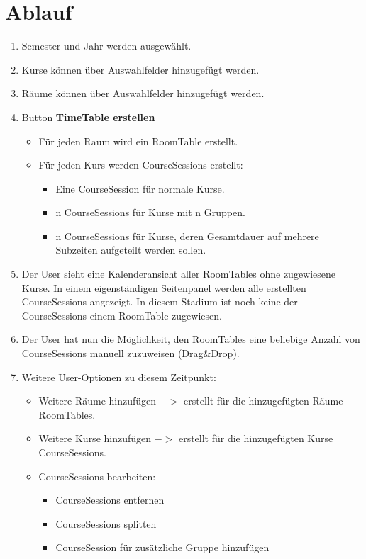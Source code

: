 \documentclass{article}
\begin{document}
	\section{Ablauf}
	\begin{enumerate}
		\item Semester und Jahr werden ausgewählt.
		\item Kurse können über Auswahlfelder hinzugefügt werden.
		\item Räume können über Auswahlfelder hinzugefügt werden.
		\item Button \textbf{TimeTable erstellen}
		\begin{itemize}
			\item Für jeden Raum wird ein RoomTable erstellt.
			\item Für jeden Kurs werden CourseSessions erstellt:
			\begin{itemize}
				\item Eine CourseSession für normale Kurse.
				\item n CourseSessions für Kurse mit n Gruppen.
				\item n CourseSessions für Kurse, deren Gesamtdauer auf mehrere Subzeiten aufgeteilt werden sollen. 
			\end{itemize}
		\end{itemize}
		\item Der User sieht eine Kalenderansicht aller RoomTables ohne zugewiesene Kurse. In einem eigenständigen Seitenpanel werden alle erstellten CourseSessions angezeigt. In diesem Stadium ist noch keine der CourseSessions einem RoomTable zugewiesen.
		\item Der User hat nun die Möglichkeit, den RoomTables eine beliebige Anzahl von CourseSessions manuell zuzuweisen (Drag\&Drop).
		\item Weitere User-Optionen zu diesem Zeitpunkt:
		\begin{itemize}
			\item Weitere Räume hinzufügen $->$ erstellt für die hinzugefügten Räume RoomTables.
			\item Weitere Kurse hinzufügen $->$ erstellt für die hinzugefügten Kurse CourseSessions.
			\item CourseSessions bearbeiten:
			\begin{itemize}
				\item CourseSessions entfernen
				\item CourseSessions splitten
				\item CourseSession für zusätzliche Gruppe hinzufügen

\end{itemize}
\end{itemize}
\end{enumerate}
\end{document}
